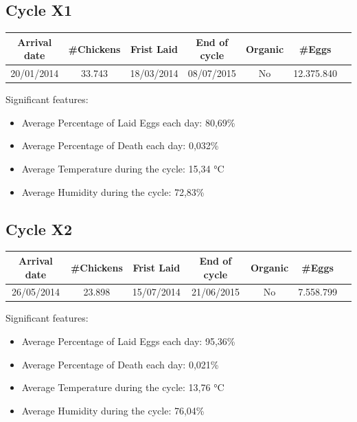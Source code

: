 \documentclass[11pt]{article}
\begin{document}
\subsection{Cycle X1}
\begin{center}
    \begin{tabular}{| c | c | c | c | c | c | c |} 
        \hline
        Arrival date & \#Chickens & Frist Laid & End of cycle & Organic & \#Eggs\\ [0.5ex] 
        \hline
        20/01/2014 & 33.743 & 18/03/2014 & 08/07/2015 & No & 12.375.840\\ 
        \hline
    \end{tabular}
\end{center}

Significant features:
\begin{itemize}
    \item Average Percentage of Laid Eggs each day: 80,69\%
    \item Average Percentage of Death each day: 0,032\%
    \item Average Temperature during the cycle: 15,34 °C
    \item Average Humidity during the cycle: 72,83\%
\end{itemize}

\subsection{Cycle X2}
\begin{center}
    \begin{tabular}{| c | c | c | c | c | c | c |} 
        \hline
        Arrival date & \#Chickens & Frist Laid & End of cycle & Organic & \#Eggs\\ [0.5ex] 
        \hline
        26/05/2014 & 23.898 & 15/07/2014 & 21/06/2015 & No & 7.558.799\\ 
        \hline
    \end{tabular}
\end{center}

Significant features:
\begin{itemize}
    \item Average Percentage of Laid Eggs each day: 95,36\%
    \item Average Percentage of Death each day: 0,021\%
    \item Average Temperature during the cycle: 13,76 °C
    \item Average Humidity during the cycle: 76,04\%
\end{itemize}
\end{document}
